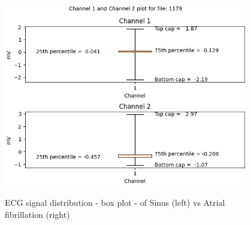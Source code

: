 \begin{figure}[ht!]
\begin{minipage}{.5\textwidth}
            \label{fig:af_box_1}
        \includegraphics[width=1.0\linewidth, height=8cm]{BachelorMasterThesis/DataExploration/Figures/atrial_fibrillation/box_plot/1179_box.png}
            \label{fig:af_box_2}
    \end{minipage}
    \caption{ECG signal distribution - box plot - of Sinus (left) vs Atrial fibrillation (right)}
    \label{fig:ecg_box_plot_1_sinus_vs_af}
\end{figure}


